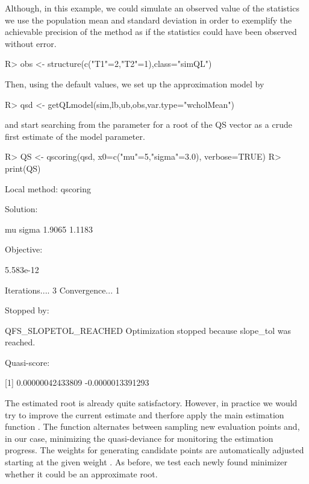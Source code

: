 \documentclass[article, nojss]{jss}
\numberwithin{equation}{section}			%
\begin{document}
Although, in this example, we could simulate an observed value  of the
statistics we use the population mean and standard deviation in order to exemplify
the achievable precision of the method as if the statistics could have been
observed without error.
\begin{Schunk}
\begin{Sinput}
R> obs <- structure(c("T1"=2,"T2"=1),class="simQL")
\end{Sinput}
\end{Schunk}
Then, using the default values, we set up the approximation model by
\begin{Schunk}
\begin{Sinput}
R> qsd <- getQLmodel(sim,lb,ub,obs,var.type="wcholMean")
\end{Sinput}
\end{Schunk}
and start searching from the parameter  for a root of the QS
vector as a crude first estimate of the model parameter.
\begin{Schunk}
\begin{Sinput}
R> QS <- qscoring(qsd, x0=c("mu"=5,"sigma"=3.0), verbose=TRUE)
R> print(QS)
\end{Sinput}
\begin{Soutput}
Local method:  qscoring 

Solution: 

    mu     sigma    
1.9065    1.1183    

Objective:

 5.583e-12 

Iterations.... 3 
Convergence... 1 

Stopped by: 

 QFS_SLOPETOL_REACHED 
 Optimization stopped because slope_tol was reached. 

Quasi-score:

[1]    0.00000042433809    -0.0000013391293
\end{Soutput}
\end{Schunk}
The estimated root is already quite satisfactory. However, in practice we would
try to improve the current estimate and therfore apply the main estimation
function . The function alternates between sampling new evaluation points and,
in our case, minimizing the quasi-deviance for monitoring the estimation
progress. The weights for generating candidate points are automatically
adjusted starting at the given weight . As before, we test each newly
found minimizer whether it could be an approximate root.
\end{document}
